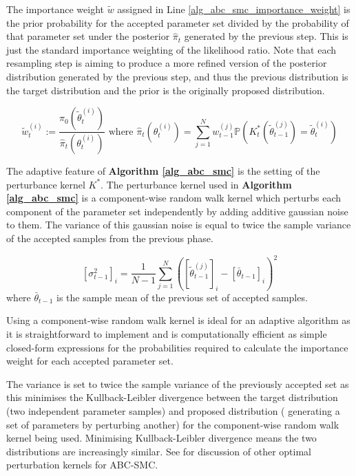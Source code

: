 \documentclass[11pt,a4paper]{article}
\newcommand*{\prob}{\mathbb{P}}
\theoremstyle{break}
\begin{document}
  \par The importance weight $\tilde{w}$ assigned in Line \ref{alg_abc_smc_importance_weight} is the prior probability for the accepted parameter set divided by the probability of that parameter set under the posterior $\hat\pi_t$ generated by the previous step. This is just the standard importance weighting of the likelihood ratio. Note that each resampling step is aiming to produce a more refined version of the posterior distribution generated by the previous step, and thus the previous distribution is the target distribution and the prior is the originally proposed distribution.

  \[ \tilde{w}_t^{(i)}:=\frac{\pi_0\left(\tilde\theta_t^{(i)}\right)}{\hat\pi_t\left(\theta_t^{(i)}\right)}\text{ where }\hat\pi_t\left(\theta_t^{(i)}\right)=\sum_{j=1}^Nw_{t-1}^{(j)}\prob\left(K_t^*\left(\tilde\theta_{t-1}^{(j)}\right)=\tilde\theta_{t}^{(i)}\right) \]

  \par The adaptive feature of \textbf{Algorithm \ref{alg_abc_smc}} is the setting of the perturbance kernel $K^*$. The perturbance kernel used in \textbf{Algorithm \ref{alg_abc_smc}} is a component-wise random walk kernel which perturbs each component of the parameter set independently by adding additive gaussian noise to them. The variance of this gaussian noise is equal to twice the sample variance of the accepted samples from the previous phase.

  \[ \left[\sigma_{t-1}^2\right]_i=\frac1{N-1}\sum_{j=1}^N\left(\left[\tilde\theta_{t-1}^{(j)}\right]_i-\left[\bar\theta_{t-1}\right]_i\right)^2 \]
  where $\bar\theta_{t-1}$ is the sample mean of the previous set of accepted samples.

  \par Using a component-wise random walk kernel is ideal for an adaptive algorithm as it is straightforward to implement and is computationally efficient as simple closed-form expressions for the probabilities required to calculate the importance weight for each accepted parameter set.

  \par The variance is set to twice the sample variance of the previously accepted set as this minimises the Kullback-Leibler divergence between the target distribution (two independent parameter samples) and proposed distribution ( generating a set of parameters by perturbing another) for the component-wise random walk kernel being used. %
  Minimising Kullback-Leibler divergence means the two distributions are increasingly similar. See \cite[]{on_optimality_of_kernels_for_approximate_bayesian_computation_using_SMC} for discussion of other optimal perturbation kernels for ABC-SMC.
\end{document}
